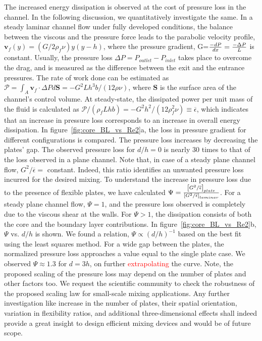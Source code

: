 \documentclass[aps,pre,twocolumn,aps,longbibliography]{revtex4-1}
\begin{document}
	
	The increased energy dissipation is observed at the cost of pressure loss in the channel. In the following discussion, we quantitatively investigate the same. In a steady laminar channel flow under fully developed conditions, the balance between the viscous and the pressure force leads to the parabolic velocity profile, $\mathbf{v}_f(y)=(G/2\rho_f\nu)y(y-h)$, where the pressure gradient, G=${-dP\over dx}={-\Delta P\over L}$ is constant. Usually, the pressure loss $\Delta P=P_{outlet}-P_{inlet}$ takes place to overcome the drag, and is measured as the difference between the exit and the entrance pressures. The rate of work done can be estimated as $\mathscr{P}=\int_{A}\mathbf{v}_f\cdot \Delta P d\mathbf{S}=-{G^2Lh^3b/(12\rho\nu)}$, where $\mathbf{S}$ is the surface area of the channel's control volume. At steady-state, the dissipated power per unit mass of the fluid is calculated as $\mathscr{P}/(\rho_f Lhb) =-G^2h^2/(12\rho_f^2\nu) \equiv\overline{\epsilon}$, which indicates that an increase in pressure loss corresponds to an increase in overall energy dissipation. In figure~\ref{fig:core_BL_vs_Re2}a, the loss in pressure gradient for different configurations is compared. The pressure loss increases by decreasing the plates' gap. The observed pressure loss for $d/h=0$ is nearly 30 times to that of the loss observed in a plane channel. Note that, in case of a steady plane channel flow, $G^2/\overline{\epsilon}=$ constant. Indeed, this ratio identifies an unwanted pressure loss incurred for the desired mixing. To understand the increase in pressure loss due to the presence of flexible plates, we have calculated $\Psi={\left[{G^2/ \overline{\epsilon}}\right]_{plate} \over \left[{G^2/\overline{\epsilon}}\right]_{laminar}}$. For a steady plane channel flow, $\Psi=1$, and the pressure loss observed is completely due to the viscous shear at the walls. For $\Psi> 1$, the dissipation consists of both the core and the boundary layer contributions. In figure~\ref{fig:core_BL_vs_Re2}b, $\Psi$ vs. $d/h$ is shown. We found a relation, $\Psi\propto (d/h)^{-1}$ based on the best fit using the least squares method. For a wide gap between the plates, the normalized pressure loss approaches a value equal to the single plate case. We observed $\Psi\approx1.3$ for $d=3h$, on further \textcolor{red}{extrapolating} the curve. Note, the proposed scaling of the pressure loss may depend on the number of plates and other factors too. We request the scientific community to check the robustness of the proposed scaling law for small-scale mixing applications. Any further investigation like increase in the number of plates, their spatial orientation, variation in flexibility ratios, and additional three-dimensional effects shall indeed provide a great insight to design efficient mixing devices and would be of future scope. 
	
\end{document}
